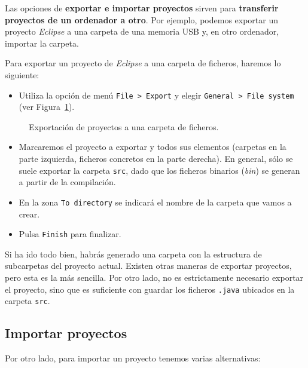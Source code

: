 \documentclass[
  spanish,
  11pt,
  a4paper,
  DIV=11,
  numbers=noendperiod]{scrartcl}
\providecommand{\tightlist}{%
  \setlength{\itemsep}{0pt}\setlength{\parskip}{0pt}}
\begin{document}
Las opciones de \textbf{exportar e importar proyectos} sirven para \textbf{transferir proyectos de un ordenador a otro}. Por ejemplo, podemos exportar un proyecto \emph{Eclipse} a una carpeta de una memoria USB y, en otro ordenador, importar la carpeta.

Para exportar un proyecto de \emph{Eclipse} a una carpeta de ficheros, haremos lo siguiente:

\begin{itemize}
\tightlist
\item
 Utiliza la opción de menú \texttt{File\ \textgreater{}\ Export} y elegir \texttt{General\ \textgreater{}\ File\ system} (ver Figura~\ref{fig-export_project}).
\end{itemize}

\begin{figure}
\caption{Exportación de proyectos a una carpeta de ficheros.}\label{fig-export_project}
\end{figure}

\begin{itemize}
\tightlist
\item
 Marcaremos el proyecto a exportar y todos sus elementos (carpetas en la parte izquierda, ficheros concretos en la parte derecha). En general, sólo se suele exportar la carpeta \texttt{src}, dado que los ficheros binarios (\emph{bin}) se generan a partir de la compilación.
\item
 En la zona \texttt{To\ directory} se indicará el nombre de la carpeta que vamos a crear.
\item
 Pulsa \texttt{Finish} para finalizar.
\end{itemize}

Si ha ido todo bien, habrás generado una carpeta con la estructura de subcarpetas del proyecto actual. Existen otras maneras de exportar proyectos, pero esta es la más sencilla. Por otro lado, no es estrictamente necesario exportar el proyecto, sino que es suficiente con guardar los ficheros \texttt{.java} ubicados en la carpeta \texttt{src}.

\subsection{Importar proyectos}\label{importar-proyectos}

Por otro lado, para importar un proyecto tenemos varias alternativas:
\end{document}
